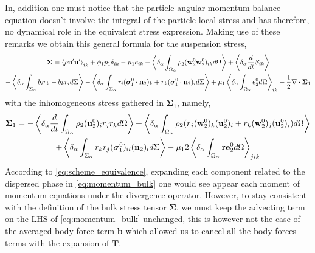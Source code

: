In, addition one must notice that the particle angular momentum balance equation doesn't involve the integral of the particle local stress and has therefore, no dynamical role in the equivalent stress expression. 
Making use of these remarks we obtain this general formula for the suspension stress,  
\begin{multline}
    \bm{\Sigma}
    = \left<\rho\textbf{u}'\textbf{u}'\right>_{ik}
    + \phi_1 p_1 \delta_{ik}
    - \mu_1 e_{ik}
    - \left<\delta_\alpha \int_{\Omega_\alpha}  \rho_2 (\textbf{w}_2^0\textbf{w}_2^0  )_{ik} d\Omega\right>
    + \left<\delta_\alpha \frac{d}{d t} {\mathcal{S}_{ik}} \right>\\
    - \left<\delta_\alpha \int_{\Sigma_\alpha}  b_{i}r_k - b_{k}r_i  d\Sigma\right>
    - \left<\delta_\alpha \int_{\Sigma_\alpha}  r_i (\bm{\sigma}_1^0 \cdot \textbf{n}_2)_{k}
    + r_k (\bm{\sigma}_1^0 \cdot \textbf{n}_2)_{i} d\Sigma\right>
    + \mu_1 \left<\delta_\alpha \int_{\Omega_\alpha} e_2^0 d\Omega\right>_{ik}
    + \frac{1}{2} \mathbf{\nabla}\cdot\bm{\Sigma}_1
    \label{eq:eq_stress}
\end{multline}
with the inhomogeneous stress gathered in $\bm{\Sigma}_1$, namely,
\begin{multline}
    \bm{\Sigma}_1
    = 
    - \left<\delta_\alpha \frac{d}{d t}\int_{\Omega_\alpha}  \rho_2 (\textbf{u}_2^0)_i r_j r_k  d\Omega\right>
    + \left<\delta_\alpha \int_{\Omega_\alpha}  \rho_2 (r_{j} (\textbf{w}_2^0)_k (\textbf{u}^0_2)_i + r_k (\textbf{w}_2^0)_j (\textbf{u}^0_2)_i) d\Omega\right>\nonumber\\
    +\left<\delta_\alpha \int_{\Sigma_\alpha}   r_{k}r_{j} (\bm{\sigma}_1^0)_{il} (\textbf{n}_2)_l  d\Sigma\right>
    - \mu_1 2 \left<\delta_\alpha \int_{\Omega_\alpha} \textbf{r} \textbf{e}_2^0 d\Omega\right>_{jik}
\end{multline}
According to \ref{eq:scheme_equivalence}, expanding each component related to the dispersed phase in \ref{eq:momentum_bulk} one would see appear each moment of momentum equations under the divergence operator.
However, to stay consistent with the definition of the bulk stress tensor $\bm{\Sigma}$, we must keep the advecting term on the LHS of \ref{eq:momentum_bulk} unchanged, this is however not the case of the averaged body force term $\textbf{b}$ which allowed us to cancel all the body forces terms with the expansion of $\textbf{T}$.  

